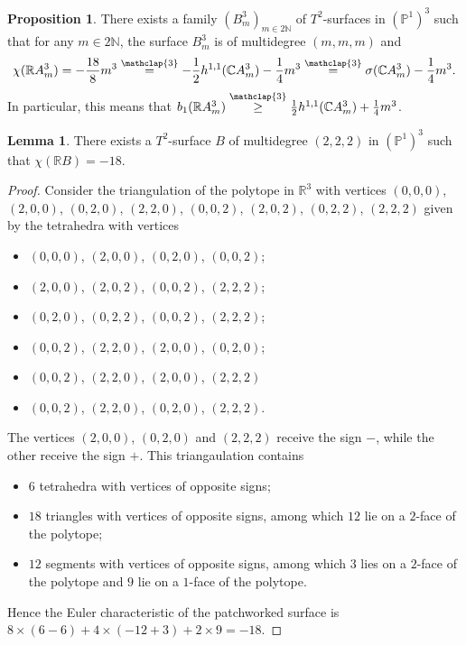 \documentclass[12pt]{article}
\newcommand\customeqtrois{\stackrel{\mathclap{\normalfont\scriptsize\mbox{3}}}{=}}
\newcommand\customgeqtrois{\stackrel{\mathclap{\normalfont\scriptsize\mbox{3}}}{\geq}}
\newcommand{\R}{\mathbb{R}}
\newcommand{\C}{\mathbb{C}}
\renewcommand{\P}{\mathbb{P}}
\newcommand{\N}{\mathbb{N}}
\theoremstyle{definition}
\newtheorem{lem}{Lemma}[section]
\newtheorem{prop}{Proposition}[section]
\begin{document}
\begin{prop}
    \label{prop_big_b1}
    There exists a family $(B_m^3)_{m \in 2\N}$ of $T^2$-surfaces in $(\P^1)^3$ such that for any $m \in 2 \N$, the surface $B_m^3$ is of multidegree $(m,m,m)$ and
    \begin{equation*}
        \chi(\R A_m^3) = -\frac{18}{8} m^3 \customeqtrois -\frac{1}{2}h^{1,1}(\C A_m^3) - \frac{1}{4}m^3
    \customeqtrois \sigma(\C A_m^3) - \frac{1}{4}m^3.    
    \end{equation*}
    In particular, this means that $b_1(\R A_m^3) \customgeqtrois \frac{1}{2}h^{1,1}(\C A_m^3) + \frac{1}{4}m^3$.
\end{prop}

\begin{lem}
    \label{lem_big_b1}
    There exists a $T^2$-surface $B$ of multidegree $(2,2,2)$ in $(\P^1)^3$ such that $\chi(\R B) = -18$.
\end{lem}

\begin{proof}
    Consider the triangulation of the polytope in $\R^3$ with vertices $(0,0,0)$, $(2,0,0)$, $(0,2,0)$, $(2,2,0)$, $(0,0,2)$, $(2,0,2)$, $(0,2,2)$, $(2,2,2)$ given by the tetrahedra with vertices
    \begin{itemize}
        \item $(0,0,0)$, $(2,0,0)$, $(0,2,0)$, $(0,0,2)$;
        \item $(2,0,0)$, $(2,0,2)$, $(0,0,2)$, $(2,2,2)$;
        \item $(0,2,0)$, $(0,2,2)$, $(0,0,2)$, $(2,2,2)$;
        \item $(0,0,2)$, $(2,2,0)$, $(2,0,0)$, $(0,2,0)$;
        \item $(0,0,2)$, $(2,2,0)$, $(2,0,0)$, $(2,2,2)$
        \item $(0,0,2)$, $(2,2,0)$, $(0,2,0)$, $(2,2,2)$.
    \end{itemize}
    The vertices $(2,0,0)$, $(0,2,0)$ and $(2,2,2)$ receive the sign $-$, while the other receive the sign $+$.
    This triangaulation contains
    \begin{itemize}
        \item $6$ tetrahedra with vertices of opposite signs;
        \item $18$ triangles with vertices of opposite signs, among which $12$ lie on a $2$-face of the polytope;
        \item $12$ segments with vertices of opposite signs, among which $3$ lies on a $2$-face of the polytope and $9$ lie on a $1$-face of the polytope.
    \end{itemize}
    Hence the Euler characteristic of the patchworked surface is $8\times(6-6) + 4\times(-12+3) + 2 \times 9 = -18$.
\end{proof}
\end{document}
